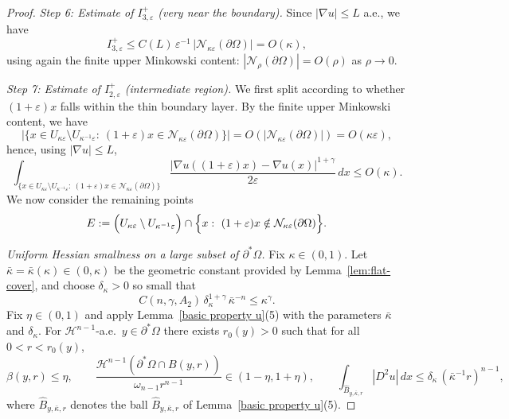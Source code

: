 \documentclass[10pt,a4paper]{amsart}
\begin{document}
\begin{proof}
\medskip
\noindent\textit{Step 6: Estimate of $I_{3,\varepsilon}^+$ (very near the boundary).}
Since $|\nabla u|\le L$ a.e., we have
\[
I_{3,\varepsilon}^+\le C(L)\,\varepsilon^{-1}\,|\mathcal N_{\kappa\varepsilon}(\partial\Omega)|
=O(\kappa),
\]
using again the finite upper Minkowski content: $|\mathcal N_{\rho}(\partial\Omega)|=O(\rho)$ as $\rho\to 0$.


\medskip
\noindent\textit{Step 7: Estimate of $I^+_{2,\varepsilon}$ (intermediate region).}
We first split according to whether $(1+\varepsilon)x$ falls within the thin boundary layer.
By the finite upper Minkowski content, we have
\[
\bigl|\{x\in U_{\kappa\varepsilon}\setminus U_{\kappa^{-1}\varepsilon}:\ (1+\varepsilon)x\in \mathcal N_{\kappa\varepsilon}(\partial\Omega)\}\bigr|
=O(|\mathcal N_{\kappa\varepsilon}(\partial\Omega)|)=O(\kappa\varepsilon),
\]
hence, using $|\nabla u|\le L$,
\begin{equation}\label{2.7}
\int_{\{x\in U_{\kappa\varepsilon}\setminus U_{\kappa^{-1}\varepsilon}:\ (1+\varepsilon)x\in \mathcal N_{\kappa\varepsilon}(\partial\Omega)\}}
\frac{|\nabla u((1+\varepsilon)x)-\nabla u(x)|^{1+\gamma}}{2\varepsilon}\,dx
\le O(\kappa).
\end{equation}
We now consider the remaining points
\[
E:=\Bigl(U_{\kappa\varepsilon}\setminus U_{\kappa^{-1}\varepsilon}\Bigr)\cap\Bigl\{x:\ (1+\varepsilon)x\notin \mathcal N_{\kappa\varepsilon}(\partial\Omega)\Bigr\}.
\]

\smallskip
\noindent\emph{Uniform Hessian smallness on a large subset of $\partial^*\Omega$.}
{Fix $\kappa\in(0,1)$. Let $\bar\kappa=\bar\kappa(\kappa)\in(0,\kappa)$ be the geometric constant provided by
Lemma~\ref{lem:flat-cover}, and choose $\delta_\kappa>0$ so small that}
\begin{equation}\label{eq:deltakappa}
{
C(n,\gamma,A_2)\,\delta_\kappa^{1+\gamma}\,\bar\kappa^{-n}\le \kappa^\gamma .
}
\end{equation}
{Fix $\eta\in(0,1)$ and apply Lemma~\ref{basic property u}(5) with the parameters $\bar\kappa$ and
$\delta_\kappa$. For $\mathscr H^{n-1}$-a.e.\ $y\in\partial^*\Omega$ there exists $r_0(y)>0$ such that for all
$0<r<r_0(y)$,}
\begin{equation}\label{three inequ}
{
\beta(y,r)\le\eta,\qquad 
\frac{\mathscr H^{n-1}(\partial^*\Omega\cap B(y,r))}{\omega_{n-1}r^{n-1}}\in(1-\eta,1+\eta),
\qquad
\int_{\widehat B_{y,\bar\kappa,r}}|D^2u|\,dx \le \delta_\kappa\,(\bar\kappa^{-1}r)^{n-1},
}
\end{equation}
{where $\widehat B_{y,\bar\kappa,r}$ denotes the ball $\hat B_{y,\bar\kappa,r}$ of Lemma~\ref{basic property u}(5).}


\end{proof}
\end{document}
